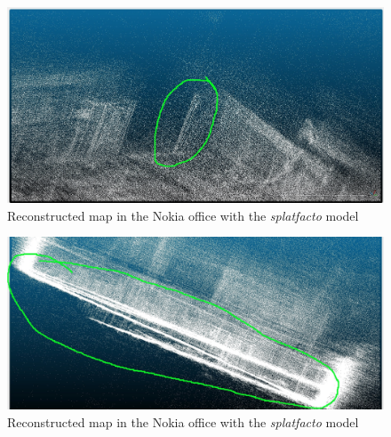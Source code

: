 \begin{figure}[htbp]
	\centering
	\includegraphics[width=150mm, keepaspectratio]{figures_jpg/pointcloud_debug.jpg}
	\caption{Reconstructed map in the Nokia office with the \textit{splatfacto} model}
	\label{fig:pointcloud_debug}
\end{figure}

\begin{figure}[htbp]
	\centering
	\includegraphics[width=150mm, keepaspectratio]{figures_jpg/pointcloud_debug1.jpg}
	\caption{Reconstructed map in the Nokia office with the \textit{splatfacto} model}
	\label{fig:pointcloud_debug1}
\end{figure}


